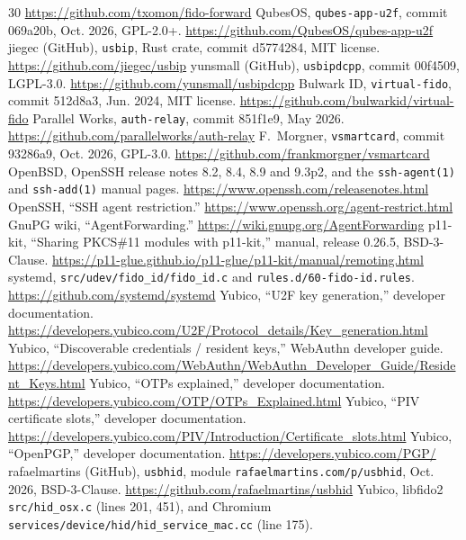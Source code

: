 \documentclass[journal,9pt]{IEEEtran}
\theoremstyle{definition}
\theoremstyle{remark}
\newcommand{\code}[1]{\texttt{#1}}
\begin{document}
\begin{thebibliography}{30}
  \url{https://github.com/txomon/fido-forward}
 QubesOS, \code{qubes-app-u2f}, commit 069a20b, Oct. 2026, GPL-2.0+.
  \url{https://github.com/QubesOS/qubes-app-u2f}
 jiegec (GitHub), \code{usbip}, Rust crate, commit d5774284, MIT license.
  \url{https://github.com/jiegec/usbip}
 yunsmall (GitHub), \code{usbipdcpp}, commit 00f4509, LGPL-3.0.
  \url{https://github.com/yunsmall/usbipdcpp}
 Bulwark ID, \code{virtual-fido}, commit 512d8a3, Jun. 2024, MIT license.
  \url{https://github.com/bulwarkid/virtual-fido}
 Parallel Works, \code{auth-relay}, commit 851f1e9, May 2026.
  \url{https://github.com/parallelworks/auth-relay}
 F.~Morgner, \code{vsmartcard}, commit 93286a9, Oct. 2026, GPL-3.0.
  \url{https://github.com/frankmorgner/vsmartcard}
 OpenBSD, OpenSSH release notes 8.2, 8.4, 8.9 and 9.3p2, and the
  \code{ssh-agent(1)} and \code{ssh-add(1)} manual pages. \url{https://www.openssh.com/releasenotes.html}
 OpenSSH, ``SSH agent restriction.'' \url{https://www.openssh.org/agent-restrict.html}
 GnuPG wiki, ``AgentForwarding.'' \url{https://wiki.gnupg.org/AgentForwarding}
 p11-kit, ``Sharing PKCS\#11 modules with p11-kit,'' manual, release 0.26.5, BSD-3-Clause.
  \url{https://p11-glue.github.io/p11-glue/p11-kit/manual/remoting.html}
 systemd, \code{src/udev/fido\_id/fido\_id.c} and \code{rules.d/60-fido-id.rules}.
  \url{https://github.com/systemd/systemd}
 Yubico, ``U2F key generation,'' developer documentation.
  \url{https://developers.yubico.com/U2F/Protocol_details/Key_generation.html}
 Yubico, ``Discoverable credentials / resident keys,'' WebAuthn developer guide.
  \url{https://developers.yubico.com/WebAuthn/WebAuthn_Developer_Guide/Resident_Keys.html}
 Yubico, ``OTPs explained,'' developer documentation.
  \url{https://developers.yubico.com/OTP/OTPs_Explained.html}
 Yubico, ``PIV certificate slots,'' developer documentation.
  \url{https://developers.yubico.com/PIV/Introduction/Certificate_slots.html}
 Yubico, ``OpenPGP,'' developer documentation. \url{https://developers.yubico.com/PGP/}
 rafaelmartins (GitHub), \code{usbhid}, module \code{rafaelmartins.com/p/usbhid}, Oct. 2026, BSD-3-Clause.
  \url{https://github.com/rafaelmartins/usbhid}
 Yubico, libfido2 \code{src/hid\_osx.c} (lines 201, 451), and Chromium
  \code{services/device/hid/hid\_service\_mac.cc} (line 175).

\end{thebibliography}
\end{document}
